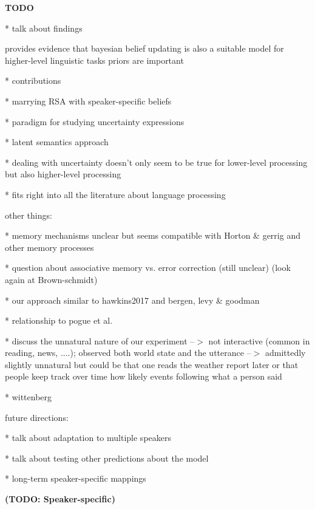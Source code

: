 \documentclass[lucida,biblatex]{sp} %
\newcommand{\todo}[1]{}
\renewcommand{\todo}[1]{{\bf \color{red} (TODO: {#1})}}
\begin{document}
{\bf TODO} 

* talk about findings

provides evidence that bayesian belief updating is also a suitable model for higher-level linguistic tasks
priors are important




* contributions
	
	* marrying RSA with speaker-specific beliefs
	
	 * paradigm for studying uncertainty expressions
	
	 * latent semantics approach

 	 * dealing with uncertainty doesn't only seem to be true for lower-level processing but also higher-level processing
	 
	  * fits right into all the literature about language processing
	
	other things:
	
	*  memory mechanisms unclear but seems compatible with Horton \& gerrig and other memory processes
	
	* question about associative memory vs. error correction (still unclear) (look again at Brown-schmidt)
	
 	*  our approach similar to hawkins2017 and bergen, levy \& goodman
	
	*  relationship to pogue et al.
	
	*  discuss the unnatural nature of our experiment --$>$ not interactive (common in reading, news, ....); observed both world state
	     and the utterance --$>$ admittedly slightly unnatural but could be that one reads the weather report later or that people keep track
	     over time how likely events following what a person said
	     
       * wittenberg


future directions:

* talk about adaptation to multiple speakers

* talk about testing other predictions about the model

* long-term speaker-specific mappings
	
\todo{Speaker-specific}


\printbibliography
%



\end{document}
